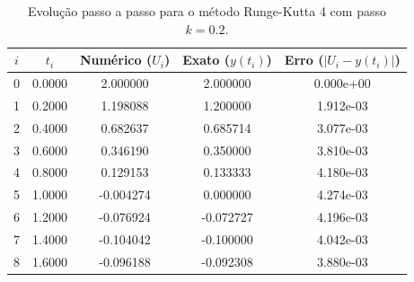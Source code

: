\begin{table}[H]
    \centering
    \begin{tabular}{ccccc}
        \hline
        $i$ & $t_i$ & Numérico ($U_i$) & Exato ($y(t_i)$) & Erro ($|U_i - y(t_i)|$) \\
        \hline
        0 & 0.0000 & 2.000000 & 2.000000 & 0.000e+00 \\
        1 & 0.2000 & 1.198088 & 1.200000 & 1.912e-03 \\
        2 & 0.4000 & 0.682637 & 0.685714 & 3.077e-03 \\
        3 & 0.6000 & 0.346190 & 0.350000 & 3.810e-03 \\
        4 & 0.8000 & 0.129153 & 0.133333 & 4.180e-03 \\
        5 & 1.0000 & -0.004274 & 0.000000 & 4.274e-03 \\
        6 & 1.2000 & -0.076924 & -0.072727 & 4.196e-03 \\
        7 & 1.4000 & -0.104042 & -0.100000 & 4.042e-03 \\
        8 & 1.6000 & -0.096188 & -0.092308 & 3.880e-03 \\
        \hline
    \end{tabular}
    \caption{Evolução passo a passo para o método Runge-Kutta 4 com passo $k=0.2$.}
    \label{tab:trajetoria_runge-kutta_4_k02}
\end{table}
